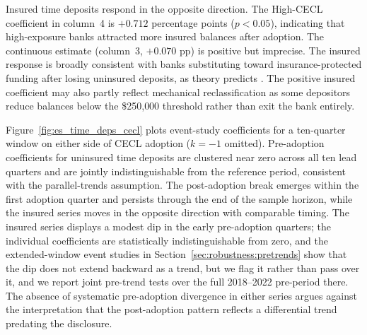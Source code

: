 Insured time deposits respond in the opposite direction.  The High-CECL
coefficient in column~4 is $+0.712$ percentage points ($p < 0.05$), indicating
that high-exposure banks attracted more insured balances after adoption.  The
continuous estimate (column~3, $+0.070$ pp) is positive but imprecise.  The
insured response is broadly consistent with banks substituting toward
insurance-protected funding after losing uninsured deposits, as theory predicts
\citep{calomiris1991role}.  The positive insured coefficient may also partly
reflect mechanical reclassification as some depositors reduce balances below the
\$250{,}000 threshold rather than exit the bank entirely.

Figure~\ref{fig:es_time_deps_cecl} plots event-study coefficients for a
ten-quarter window on either side of CECL adoption ($k = -1$ omitted).
Pre-adoption coefficients for uninsured time deposits are clustered near zero
across all ten lead quarters and are jointly indistinguishable from the reference
period, consistent with the parallel-trends assumption.  The post-adoption break
emerges within the first adoption quarter and persists through the end of the
sample horizon, while the insured series moves in the opposite direction with
comparable timing.  The insured series displays a modest dip in the early
pre-adoption quarters; the individual coefficients are statistically
indistinguishable from zero, and the extended-window event studies in
Section~\ref{sec:robustness:pretrends} show that the dip does not extend
backward as a trend, but we flag it rather than pass over it, and we report
joint pre-trend tests over the full 2018--2022 pre-period there.  The absence
of systematic pre-adoption divergence in either series
argues against the interpretation that the post-adoption pattern reflects a
differential trend predating the disclosure.

